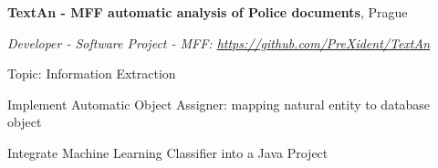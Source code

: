\documentclass[9pt]{extreport}
\renewcommand{\section}[2]%
		{\pagebreak[2]\vspace{0.8\baselineskip}%
			\hspace{0in}%
			\marginpar{
				\raggedright \emph{#1}}#2}
\newenvironment{innerlist}[1][\enskip\textbullet]%
		{\vspace{0.2\baselineskip}\begin{compactitem}[#1]}{\end{compactitem}}
\begin{document}
			
			\section{2013-2014}
			\textbf{TextAn - MFF automatic analysis of Police documents}, Prague
			
			\begin{innerlist}
				
				\item[] \textit{Developer - Software Project - MFF:  \href{https://github.com/PreXident/TextAn}{https://github.com/PreXident/TextAn}} 
				\begin{innerlist}
					\item Topic: Information Extraction
					\begin{innerlist}
						\item Implement Automatic Object Assigner: mapping natural entity to database object
						\item Integrate Machine Learning Classifier into a Java Project
					\end{innerlist}
				\end{innerlist}
			\end{innerlist}
			
\end{document}
